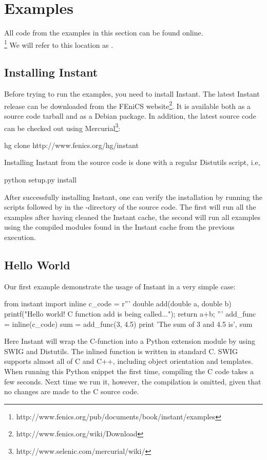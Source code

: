 \section{Examples}
\label{sec:examples}
All code from the examples in this section can be found online.\\
\footnote{http://www.fenics.org/pub/documents/book/instant/examples} We will refer
to this location as .

\subsection{Installing Instant}
Before trying to run the examples, you need to install Instant.
The latest Instant release can be downloaded from the FEniCS
website\footnote{http://www.fenics.org/wiki/Download}. It is
available both as a source code tarball and as a Debian package. In addition, the latest
source code can be checked out using
Mercurial\footnote{http://www.selenic.com/mercurial/wiki/}:
\begin{code}
hg clone http://www.fenics.org/hg/instant
\end{code}
Installing Instant
from the source code is done with a regular Distutils script, i.e,  
\begin{code}
python setup.py install
\end{code}
After successfully
installing Instant, one can verify the installation by running the scripts
 followed by  in the
-directory of the source code. The first will run all the examples after having
cleaned the Instant cache, the second will run all examples using the
compiled modules found in the Instant cache from the previous execution. 


\subsection{Hello World}
Our first example demonstrate the usage of Instant in a very simple case:
\begin{code}
from instant import inline
c_code = r'''
double add(double a, double b)
{
  printf("Hello world! C function add is being called...\n");
  return a+b;
}'''
add_func = inline(c_code)
sum = add_func(3, 4.5)
print 'The sum of 3 and 4.5 is', sum
\end{code}
Here Instant will wrap the C-function  into a Python extension module by using
SWIG and Distutils. 
The inlined function is written in standard C. SWIG supports almost
all of C and C++, including object orientation and templates. When running
this Python snippet the first time, compiling the C code takes a few seconds. Next time we run
it, however, the compilation is omitted, given that no changes are made to the
C source code. 

